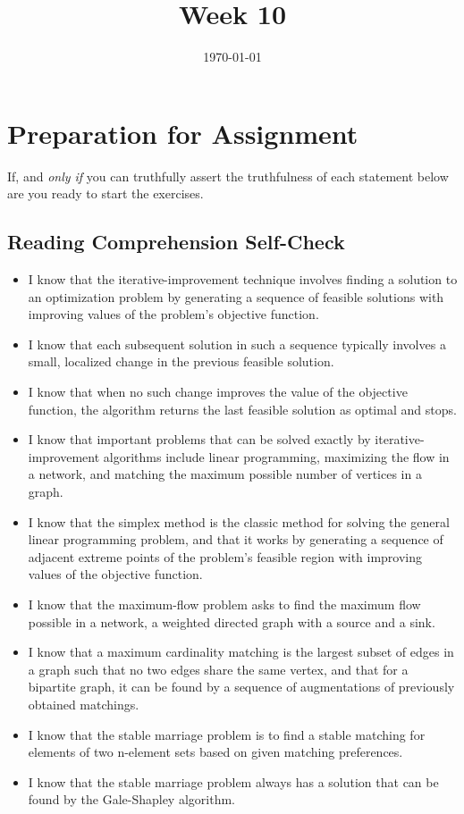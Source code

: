 \documentclass[12pt]{amsart}
\title{Week 10}
\date{\today}
\begin{document}
\maketitle

\section{Preparation for Assignment}
If, and \textit{only if} you can truthfully assert the truthfulness of each statement below are you ready to start the exercises.
\subsection {Reading Comprehension Self-Check}
\begin{itemize}
\item I know that the iterative-improvement technique involves finding a solution to an optimization problem by generating a sequence of feasible solutions with improving values of the problem\textquoteright s objective function.
\item I know that each subsequent solution in such a sequence typically involves a small, localized change in the previous feasible solution.
\item I know that when no such change improves the value of the objective function, the algorithm returns the last feasible solution as optimal and stops.
\item I know that important problems that can be solved exactly by iterative-improvement algorithms include linear programming, maximizing the flow in a network, and matching the maximum possible number of vertices in a graph.
\item I know that the simplex method is the classic method for solving the general linear programming problem, and that it works by generating a sequence of adjacent extreme points of the problem\textquoteright s feasible region with improving values of the objective function.
\item I know that the maximum-flow problem asks to find the maximum flow possible in a network, a weighted directed graph with a source and a sink.
\item I know that a maximum cardinality matching is the largest subset of edges in a graph such that no two edges share the same vertex, and that for a bipartite graph, it can be found by a sequence of augmentations of previously obtained matchings.
\item I know that the stable marriage problem is to find a stable matching for elements of two n-element sets based on given matching preferences.
\item I know that the stable marriage problem always has a solution that can be found by the Gale-Shapley algorithm.

\end{itemize}
\end{document}
